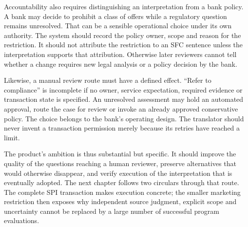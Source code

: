 
Accountability also requires distinguishing an interpretation from a bank policy.
A bank may decide to prohibit a class of offers while a regulatory question
remains unresolved. That can be a sensible operational choice under its own
authority. The system should record the policy owner, scope and reason for the
restriction. It should not attribute the restriction to an SFC sentence unless
the interpretation supports that attribution. Otherwise later reviewers cannot
tell whether a change requires new legal analysis or a policy decision by the
bank.

Likewise, a manual review route must have a defined effect. ``Refer to compliance''
is incomplete if no owner, service expectation, required evidence or transaction
state is specified. An unresolved assessment may hold an automated approval,
route the case for review or invoke an already approved conservative policy. The
choice belongs to the bank's operating design. The translator should never
invent a transaction permission merely because its retries have reached a limit.

The product's ambition is thus substantial but specific. It should improve the
quality of the questions reaching a human reviewer, preserve alternatives that
would otherwise disappear, and verify execution of the interpretation that is
eventually adopted. The next chapter follows two circulars through that route. The complete
SPI transaction makes execution concrete; the smaller marketing restriction
then exposes why independent source judgment, explicit scope and uncertainty
cannot be replaced by a large number of successful program evaluations.
